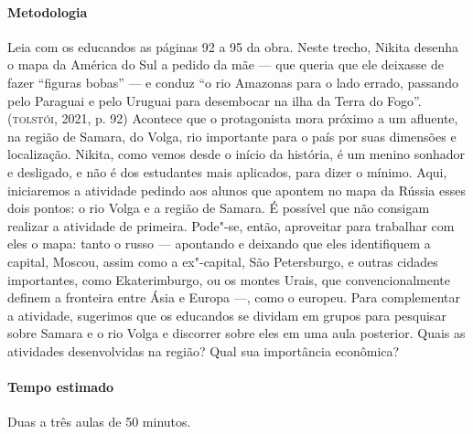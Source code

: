 \paragraph{Metodologia}
Leia com os educandos as páginas 92 a 95 da obra. Neste trecho, Nikita
desenha o mapa da América do Sul a pedido da mãe --- que queria que ele
deixasse de fazer ``figuras bobas'' --- e conduz ``o rio Amazonas para o
lado errado, passando pelo Paraguai e pelo Uruguai para desembocar na
ilha da Terra do Fogo''. (\textsc{tolstói}, 2021, p. 92) Acontece que o protagonista mora
próximo a um afluente, na região de Samara, do Volga, rio
importante para o país por suas dimensões e localização. Nikita,
como vemos desde o início da história, é um menino sonhador e desligado,
e não é dos estudantes mais aplicados, para dizer o mínimo. Aqui,
iniciaremos a atividade pedindo aos alunos que apontem no mapa da Rússia
esses dois pontos: o rio Volga e a região de Samara. É possível que não
consigam realizar a atividade de primeira. Pode"-se, então, aproveitar
para trabalhar com eles o mapa: tanto o russo --- apontando e deixando
que eles identifiquem a capital, Moscou, assim como a ex"-capital, São
Petersburgo, e outras cidades importantes, como Ekaterimburgo, ou os
montes Urais, que convencionalmente definem a fronteira entre Ásia e
Europa ---, como o europeu. Para complementar a atividade, sugerimos que
os educandos se dividam em grupos para pesquisar sobre Samara e o rio
Volga e discorrer sobre eles em uma aula posterior. Quais as atividades
desenvolvidas na região? Qual sua importância econômica?

\paragraph{Tempo estimado} Duas a três aulas de 50 minutos.